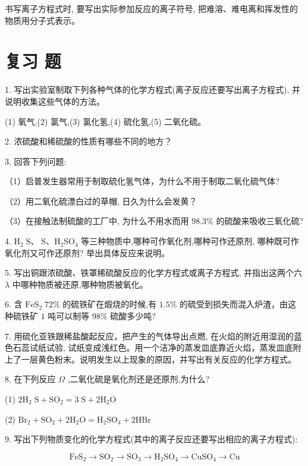 \documentclass[10pt]{article}
\begin{document}
书写离子方程式时, 要写出实际参加反应的离子符号, 把难溶、难电离和挥发性的物质用分子式表示。

\section*{复习 题}

1. 写出实验室制取下列各种气体的化学方程式(离子反应还要写出离子方程式), 并说明收集这些气体的方法。

(1) 氧气,(2) 氯气,(3) 氯化氢,(4) 硫化氢,(5) 二氧化硫。

2. 浓硫酸和稀硫酸的性质有哪些不同的地方？

3. 回答下列问题:

（1）启普发生器常用于制取硫化氢气体，为什么不用于制取二氧化硫气体?

（2）用二氧化硫漂白过的草帽, 日久为什么会发黄？

（3）在接触法制硫酸的工厂中, 为什么不用水而用 \({98.3}\%\) 的硫酸来吸收三氧化硫?

4. \({\mathrm{H}}_{2}\mathrm{\;S}\text{、}\mathrm{\;S}\text{、}{\mathrm{H}}_{2}{\mathrm{{SO}}}_{4}\) 等三种物质中,哪种可作氧化剂,哪种可作还原剂, 哪种既可作氧化剂又可作还原剂? 举出具体反应来说明。

5. 写出铜跟浓硫酸、铁罩稀硫酸反应的化学方程式或离子方程式, 并指出这两个六 \(\lambda\) 中哪种物质被还原,哪种物质被氧化。

6. 含 \({\mathrm{{FeS}}}_{2}\;{72}\%\) 的硫铁矿在煅烧的时候,有 \({1.5}\%\) 的硫受到损失而混入炉渣，由这种硫铁矿 \(1\) 吨可以制等 \({98}\%\) 硫酸多少吨?

7. 用硫化亚铁跟稀盐酸起反应，把产生的气体导出点燃, 在火焰的附近用湿润的蓝色石蕊试纸试验, 试纸变成浅红色。用一个洁净的蒸发皿底靠近火焰，蒸发皿底附上了一层黄色粉末。说明发生以上现象的原因，并写出有关反应的化学方程式。

8. 在下列反应 \(\Omega\) ,二氧化硫是氧化剂还是还原剂,为什么?

(1) \(2{\mathrm{H}}_{2}\mathrm{\;S} + {\mathrm{{SO}}}_{2} = 3\mathrm{\;S} + 2{\mathrm{H}}_{2}\mathrm{O}\)

(2) \({\mathrm{{Br}}}_{2} + {\mathrm{{SO}}}_{2} + 2{\mathrm{H}}_{2}\mathrm{O} = {\mathrm{H}}_{2}{\mathrm{{SO}}}_{4} + 2\mathrm{{HBr}}\)

9. 写出下列物质变化的化学方程式(其中的离子反应还要写出相应的离子方程式):

\[
{\mathrm{{FeS}}}_{2} \rightarrow {\mathrm{{SO}}}_{2} \rightarrow {\mathrm{{SO}}}_{3} \rightarrow {\mathrm{H}}_{2}{\mathrm{{SO}}}_{4} \rightarrow {\mathrm{{CuSO}}}_{4} \rightarrow \mathrm{{Cu}}
\]
\end{document}
